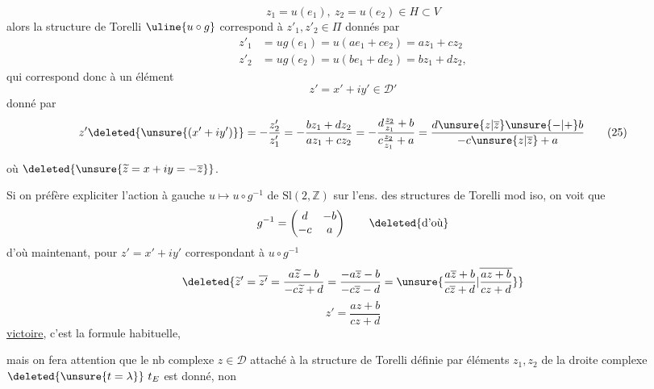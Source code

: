 \[
z_1=u(e_1),\ z_2=u(e_2)\in H\subset V
\]
alors la structure de Torelli $\uline{u\circ g}$ correspond à $z'_1,z'_2\in\Pi$ donnés par
\[
\begin{aligned}
z'_1&=ug(e_1)=u(ae_1+ce_2)=az_1+cz_2\\
z'_2&=ug(e_2)=u(be_1+de_2)=bz_1+dz_2,
\end{aligned}
\]
qui correspond donc à un élément
\[
z'=x'+iy'\in\mathcal D'
\]
donné par
\begin{equation}
z'\deleted{\unsure{(x'+iy')}}=
-\frac{z'_2}{z'_1}
=-\frac{bz_1+dz_2}{az_1+cz_2}
=-\frac{d\frac{z_2}{z_1}+b}{c\frac{z_2}{z_1}+a}
=\frac{d\unsure{z|\overline z}\unsure{-|+}b}{-c\unsure{z|\overline z}+a}
\tag{25}
\end{equation}

où $\deleted{\unsure{\widetilde z=x+iy=-\overline z}}$.

Si on  préfère expliciter l'action à gauche $u\longmapsto u\circ g^{-1}$ de $\mathrm{Sl}(2,\mathbb Z)$ sur l'ens. des structures de Torelli mod iso, on voit que
\[
g^{-1}=\begin{pmatrix}d&-b\\-c&a\end{pmatrix}
\qquad\deleted{\text{d'où}}
\]
d'où maintenant, pour $z'=x'+iy'$ correspondant à $u\circ g^{-1}$
\[
\deleted{\widetilde z'=\overline{z'}
=\frac{a\widetilde z-b}{-c\widetilde z+d}
=\frac{-a\overline z-b}{-c\overline z-d}
=\unsure{\frac{a\overline z+b}{c\overline z+d}|\overline{\frac{az+b}{cz+d}}}}
\]
\begin{equation}
z'=\frac{az+b}{cz+d}
\tag{25 bis}
\end{equation}
\uline{victoire}, c'est la formule habituelle,

mais on fera attention que le nb complexe $z\in\mathcal D$ attaché à la structure de Torelli définie par  éléments $z_1,z_2$ de la droite complexe $\deleted{\unsure{t=\lambda}}\ t_E$ est donné, non
